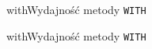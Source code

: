 
\begin{qxtab}{with}{Wydajność metody \texttt{WITH}}
\end{qxtab}

\begin{qxfig}{with}{Wydajność metody \texttt{WITH}}
\end{qxfig}














